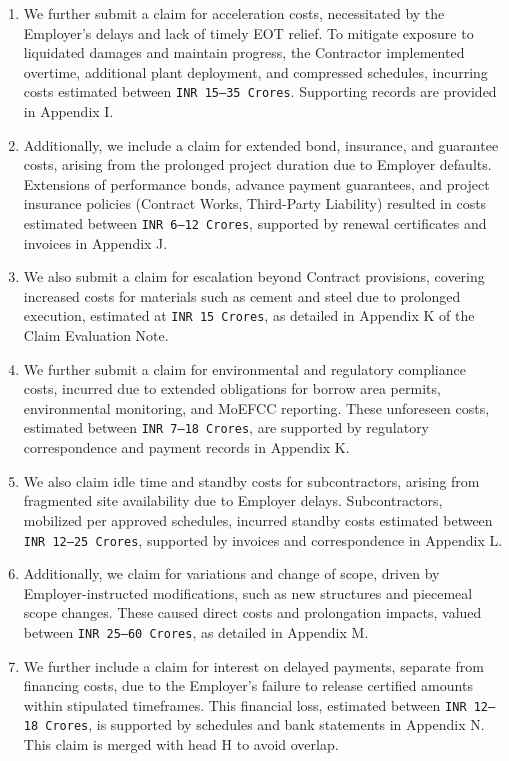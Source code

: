 \documentclass[12pt,letterpaper]{article}
\begin{document}
\begin{enumerate}
		\item We further submit a claim for acceleration costs, necessitated by the Employer’s delays and lack of timely EOT relief. To mitigate exposure to liquidated damages and maintain progress, the Contractor implemented overtime, additional plant deployment, and compressed schedules, incurring costs estimated between \texttt{INR 15--35 Crores}. Supporting records are provided in Appendix I.
		\item Additionally, we include a claim for extended bond, insurance, and guarantee costs, arising from the prolonged project duration due to Employer defaults. Extensions of performance bonds, advance payment guarantees, and project insurance policies (Contract Works, Third-Party Liability) resulted in costs estimated between \texttt{INR 6--12 Crores}, supported by renewal certificates and invoices in Appendix J.
		\item We also submit a claim for escalation beyond Contract provisions, covering increased costs for materials such as cement and steel due to prolonged execution, estimated at \texttt{INR 15 Crores}, as detailed in Appendix K of the Claim Evaluation Note.
		\item We further submit a claim for environmental and regulatory compliance costs, incurred due to extended obligations for borrow area permits, environmental monitoring, and MoEFCC reporting. These unforeseen costs, estimated between \texttt{INR 7--18 Crores}, are supported by regulatory correspondence and payment records in Appendix K.
		\item We also claim idle time and standby costs for subcontractors, arising from fragmented site availability due to Employer delays. Subcontractors, mobilized per approved schedules, incurred standby costs estimated between \texttt{INR 12--25 Crores}, supported by invoices and correspondence in Appendix L.
		\item Additionally, we claim for variations and change of scope, driven by Employer-instructed modifications, such as new structures and piecemeal scope changes. These caused direct costs and prolongation impacts, valued between \texttt{INR 25--60 Crores}, as detailed in Appendix M.
		\item We further include a claim for interest on delayed payments, separate from financing costs, due to the Employer’s failure to release certified amounts within stipulated timeframes. This financial loss, estimated between \texttt{INR 12--18 Crores}, is supported by schedules and bank statements in Appendix N. This claim is merged with head H to avoid overlap.

\end{enumerate}
\end{document}
